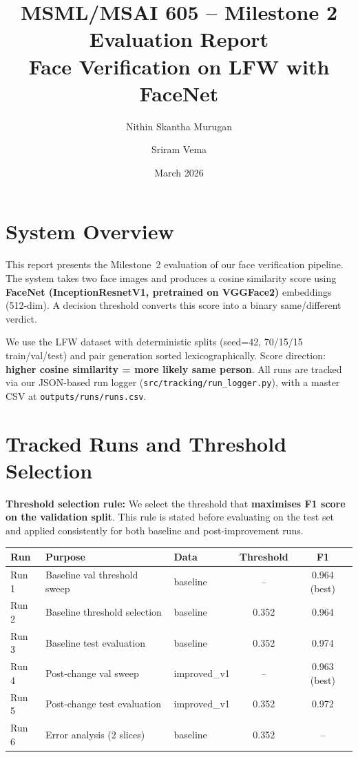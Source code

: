 \documentclass[11pt,a4paper]{article}
\title{MSML/MSAI 605 -- Milestone 2 Evaluation Report\\
\large Face Verification on LFW with FaceNet}
\author{Nithin Skantha Murugan \and Sriram Vema}
\date{March 2026}
\begin{document}
\maketitle

\section{System Overview}

This report presents the Milestone~2 evaluation of our face verification pipeline.
The system takes two face images and produces a cosine similarity score using
\textbf{FaceNet (InceptionResnetV1, pretrained on VGGFace2)} embeddings (512-dim).
A decision threshold converts this score into a binary same/different verdict.

We use the LFW dataset with deterministic splits (seed=42, 70/15/15 train/val/test)
and pair generation sorted lexicographically.
Score direction: \textbf{higher cosine similarity = more likely same person}.
All runs are tracked via our JSON-based run logger (\texttt{src/tracking/run\_logger.py}),
with a master CSV at \texttt{outputs/runs/runs.csv}.

\section{Tracked Runs and Threshold Selection}

\textbf{Threshold selection rule:} We select the threshold that \textbf{maximises F1 score
on the validation split}. This rule is stated before evaluating on the test set and applied
consistently for both baseline and post-improvement runs.

\begin{table}[h]
\centering
\small
\begin{tabular}{@{}lllcc@{}}
\toprule
\textbf{Run} & \textbf{Purpose} & \textbf{Data} & \textbf{Threshold} & \textbf{F1} \\
\midrule
Run 1 & Baseline val threshold sweep     & baseline    & --    & 0.964 (best) \\
Run 2 & Baseline threshold selection     & baseline    & 0.352  & 0.964 \\
Run 3 & Baseline test evaluation         & baseline    & 0.352  & 0.974 \\
Run 4 & Post-change val sweep            & improved\_v1 & --    & 0.963 (best) \\
Run 5 & Post-change test evaluation      & improved\_v1 & 0.352  & 0.972 \\
Run 6 & Error analysis (2 slices)        & baseline    & 0.352  & -- \\
\bottomrule
\end{tabular}
\end{table}
\end{document}

